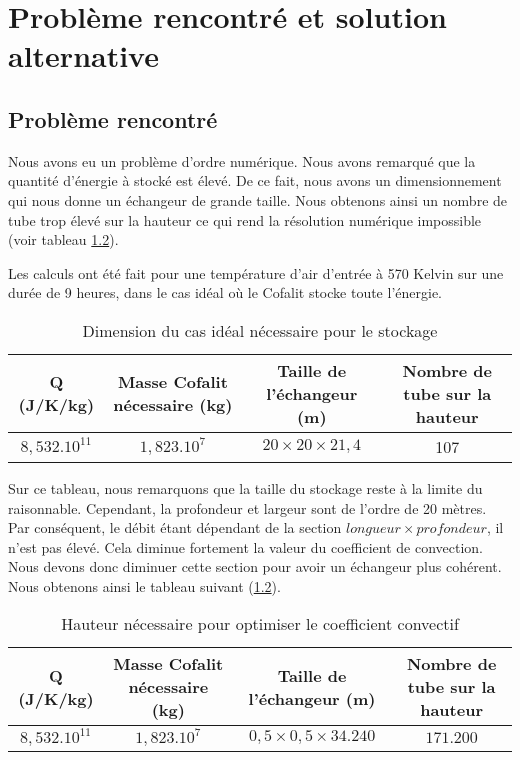 \chapter{Problème rencontré et solution alternative}

\section{Problème rencontré}

Nous avons eu un problème d'ordre numérique. Nous avons remarqué que la quantité d'énergie à stocké est élevé. De ce fait, nous avons un dimensionnement qui nous donne un échangeur de grande taille. Nous obtenons ainsi un nombre de tube trop élevé sur la hauteur ce qui rend la résolution numérique impossible (voir tableau \ref{prob_dim_2}). 

Les calculs ont été fait pour une température d'air d'entrée à 570 Kelvin sur une durée de 9 heures, dans le cas idéal où le Cofalit stocke toute l'énergie.  

\begin{table}[!h]
\centering
\begin{tabular}{|c|c|c|c|}
\hline 
Q (J/K/kg) & Masse Cofalit nécessaire (kg) & Taille de l'échangeur (m) & Nombre de tube sur la hauteur\\ 
\hline 
$8,532.10^{11}$ & $1,823.10^{7}$ & $20\times20\times21,4$ & 107\\ 
\hline 
\end{tabular} 

\caption{Dimension du cas idéal nécessaire pour le stockage}
\label{prob_dim}
\end{table}


Sur ce tableau, nous remarquons que la taille du stockage reste à la limite du raisonnable. Cependant, la profondeur et largeur sont de l'ordre de 20 mètres. Par conséquent, le débit étant dépendant de la section $longueur \times profondeur$, il n'est pas élevé. Cela diminue fortement la valeur du coefficient de convection. Nous devons donc diminuer cette section pour avoir un échangeur plus cohérent. Nous obtenons ainsi le tableau suivant (\ref{prob_dim_2}).


\begin{table}[!h]
\centering
\begin{tabular}{|c|c|c|c|}
\hline 
Q (J/K/kg) & Masse Cofalit nécessaire (kg) & Taille de l'échangeur (m) & Nombre de tube sur la hauteur\\ 
\hline 
$8,532.10^{11}$ & $1,823.10^{7}$ & $0,5\times0,5\times34.240$ & $171.200$\\ 
\hline 
\end{tabular} 

\caption{Hauteur nécessaire pour optimiser le coefficient convectif}
\label{prob_dim_2}
\end{table}

